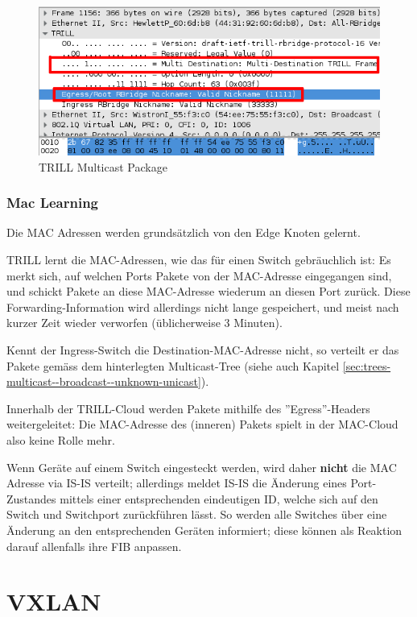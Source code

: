 \begin{figure}[H]
\centering
\includegraphics[width=0.7\linewidth]{images/trill_header_multicast}
\caption{TRILL Multicast Package}
\label{fig:trillheadermulticastpackage}
\end{figure}

\subsubsection{Mac Learning}\label{sec:mac-learning}
Die MAC Adressen werden grundsätzlich von den Edge Knoten gelernt.

TRILL lernt die MAC-Adressen, wie das für einen Switch gebräuchlich ist: Es merkt sich, auf welchen Ports Pakete von der MAC-Adresse eingegangen sind, und schickt Pakete an diese MAC-Adresse wiederum an diesen Port zurück. Diese Forwarding-Information wird allerdings nicht lange gespeichert, und meist nach kurzer Zeit wieder verworfen (üblicherweise 3 Minuten).

Kennt der Ingress-Switch die Destination-MAC-Adresse nicht, so verteilt er das Pakete gemäss dem hinterlegten Multicast-Tree (siehe auch Kapitel \ref{sec:trees-multicast--broadcast--unknown-unicast}).

Innerhalb der TRILL-Cloud werden Pakete mithilfe des ''Egress''-Headers weitergeleitet: Die MAC-Adresse des (inneren) Pakets spielt in der MAC-Cloud also keine Rolle mehr.

Wenn Geräte auf einem Switch eingesteckt werden, wird daher \textbf{nicht} die MAC Adresse via IS-IS verteilt; allerdings meldet IS-IS die Änderung eines Port-Zustandes mittels einer entsprechenden eindeutigen ID, welche sich auf den Switch und Switchport zurückführen lässt. So werden alle Switches über eine Änderung an den entsprechenden Geräten informiert; diese können als Reaktion darauf allenfalls ihre FIB anpassen.

\section{VXLAN}
